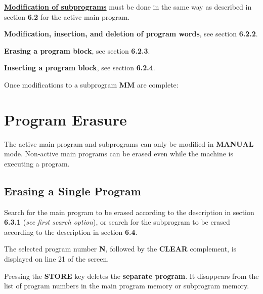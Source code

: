 \underline{\textbf{Modification of subprograms}} must be done in the same way as described in section \textbf{6.2} for the active main program.

\textbf{Modification, insertion, and deletion of program words}, see section \textbf{6.2.2}.

\textbf{Erasing a program block}, see section \textbf{6.2.3}.  

\textbf{Inserting a program block}, see section \textbf{6.2.4}.

Once modifications to a subprogram \textbf{MM} are complete:

\begin{itemize}
\end{itemize}

\newpage

\section{Program Erasure}

The active main program and subprograms can only be modified in \textbf{MANUAL} mode.  
Non-active main programs can be erased even while the machine is executing a program.

\subsection{Erasing a Single Program}

\procedure

Search for the main program to be erased according to the description in section \textbf{6.3.1} (\textit{see first search option}),  
    or search for the subprogram to be erased according to the description in section \textbf{6.4}.

\begin{itemize}
\end{itemize}

The selected program number \textbf{N}, followed by the \textbf{CLEAR} complement, is displayed on line 21 of the screen.

\begin{itemize}
\end{itemize}

Pressing the \textbf{STORE} key deletes the \textbf{separate program}.  
It disappears from the list of program numbers in the main program memory or subprogram memory.

